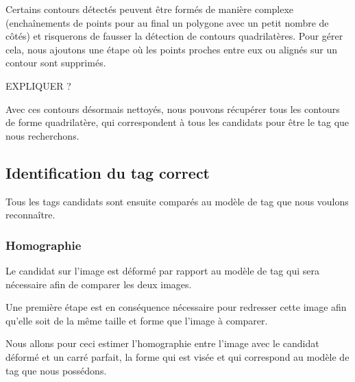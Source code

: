         Certains contours détectés peuvent être formés de manière complexe (enchaînements de points pour au final un polygone avec un petit nombre de côtés) et risquerons de fausser la détection de contours quadrilatères. Pour gérer cela, nous ajoutons une étape où les points proches entre eux ou alignés sur un contour sont supprimés.

        EXPLIQUER ?

        Avec ces contours désormais nettoyés, nous pouvons récupérer tous les contours de forme quadrilatère, qui correspondent à tous les candidats pour être le tag que nous recherchons.

        \subsection{Identification du tag correct}

        Tous les tags candidats sont ensuite comparés au modèle de tag que nous voulons reconnaître.

        \subsubsection{Homographie}

        Le candidat sur l'image est déformé par rapport au modèle de tag qui sera nécessaire afin de comparer les deux images.

        Une première étape est en conséquence nécessaire pour redresser cette image afin qu'elle soit de la même taille et forme que l'image à comparer.

        Nous allons pour ceci estimer l'homographie entre l'image avec le candidat déformé et un carré parfait, la forme qui est visée et qui correspond au modèle de tag que nous possédons.


